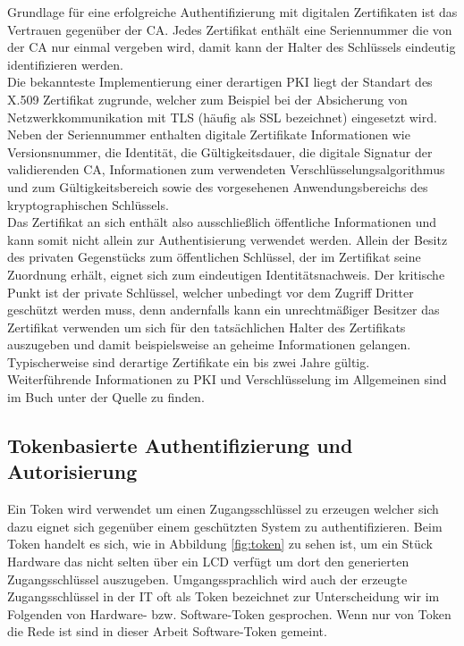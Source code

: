 \documentclass[
book,
a4paper,   
titlepage,  
halfparskip,
12pt        
]{scrartcl}
\begin{document}
\begin{onehalfspacing}
Grundlage für eine erfolgreiche Authentifizierung mit digitalen Zertifikaten ist das Vertrauen gegenüber der \ac{CA}. Jedes Zertifikat enthält eine Seriennummer die von der \ac{CA} nur einmal vergeben wird, damit kann der Halter des Schlüssels eindeutig identifizieren werden.\\
Die bekannteste Implementierung einer derartigen \ac{PKI} liegt der Standart des X.509 Zertifikat zugrunde, welcher zum Beispiel bei der Absicherung von Netzwerkkommunikation mit \ac{TLS} (häufig als \ac{SSL} bezeichnet) eingesetzt wird. Neben der Seriennummer enthalten digitale Zertifikate Informationen wie Versionsnummer, die Identität, die Gültigkeitsdauer, die digitale Signatur der validierenden \ac{CA}, Informationen zum verwendeten Verschlüsselungsalgorithmus und zum Gültigkeitsbereich sowie des vorgesehenen Anwendungsbereichs des kryptographischen Schlüssels.\cite[S. 144]{kerberos2}\\
Das Zertifikat an sich enthält also ausschließlich öffentliche Informationen und kann somit nicht allein zur Authentisierung verwendet werden. Allein der Besitz des privaten Gegenstücks zum öffentlichen Schlüssel, der im Zertifikat seine Zuordnung erhält, eignet sich zum eindeutigen Identitätsnachweis. Der kritische Punkt ist der private Schlüssel, welcher unbedingt vor dem Zugriff Dritter geschützt werden muss, denn andernfalls kann ein unrechtmäßiger Besitzer das Zertifikat verwenden um sich für den tatsächlichen Halter des Zertifikats auszugeben und damit beispielsweise an geheime Informationen gelangen. Typischerweise sind derartige Zertifikate ein bis zwei Jahre gültig.\cite[S. 145f]{kerberos2}\\
Weiterführende Informationen zu \ac{PKI} und Verschlüsselung im Allgemeinen sind im Buch unter der Quelle \cite{crypto} zu finden.

\subsection{Tokenbasierte Authentifizierung und Autorisierung}
\label{subsec:token}
Ein Token wird verwendet um einen Zugangsschlüssel zu erzeugen welcher sich dazu eignet sich gegenüber einem geschützten System zu authentifizieren. Beim Token handelt es sich, wie in Abbildung \vref{fig:token} zu sehen ist, um ein Stück Hardware das nicht selten über ein \ac{LCD} verfügt um dort den generierten Zugangsschlüssel auszugeben. Umgangssprachlich wird auch der erzeugte Zugangsschlüssel in der \ac{IT} oft als Token bezeichnet zur Unterscheidung wir im Folgenden von Hardware- bzw. Software-Token gesprochen. Wenn nur von Token die Rede ist sind in dieser Arbeit Software-Token gemeint.\cite[S.141ff]{kerberos2}


\end{onehalfspacing}
\end{document}
